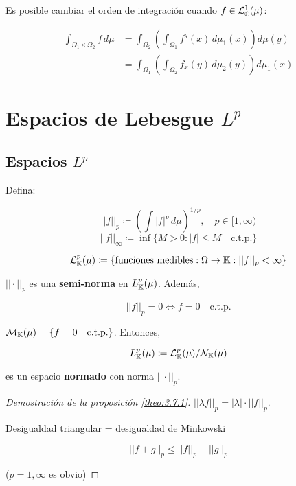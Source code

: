 \begin{ftheorem}[Fubini]
    Es posible cambiar el orden de integración cuando $f\in \mathcal{L}_{\mathbb{C}}^1(\mu)$:

    \begin{align*}
        \int_{\Omega_1\times\Omega_2}f\,d\mu&=\int_{\Omega_2}\left(\int_{\Omega_1} f^y(x)\,d\mu_1(x)\right)d\mu(y)\\
        &=\int_{\Omega_1}\left(\int_{\Omega_2} f_x(y)\,d\mu_2(y)\right)d\mu_1(x)
    \end{align*}

\end{ftheorem}

\section{Espacios de Lebesgue $L^p$}

\subsection{Espacios $L^p$}

Defina: 

\[||f||_p\coloneqq \left(\int |f|^p\,d\mu\right)^{1/p},\quad p\in[1,\infty)\]
\[||f||_\infty\coloneqq \inf\{M>0: |f|\leq M\quad \text{c.t.p.}\}\]

\[\mathcal{L}_{\mathbb{K}}^p(\mu)\coloneqq \{\text{funciones medibles}:\Omega\to\mathbb{K}:||f||_p<\infty\}\]

\begin{fproposition}\label{theo:3.7.1}
    $||\cdot||_p$ es una \textbf{semi-norma} en $L_{\mathbb{K}}^p(\mu)$. Además, 

    \[||f||_p=0\iff f=0\quad\text{c.t.p.}\]
\end{fproposition}

\begin{fcorollary}
    $\mathcal{M}_{\mathbb{K}}(\mu)=\{f=0\quad \text{c.t.p.}\}$. Entonces, 

    \[L_{\mathbb{K}}^p(\mu)\coloneqq \mathcal{L}_{\mathbb{K}}^p(\mu)/\mathcal{N}_{\mathbb{K}}(\mu)\]

    es un espacio \textbf{normado} con norma $||\cdot||_p$.
\end{fcorollary}

\begin{proof}[Demostración de la proposición \ref{theo:3.7.1}]
    $||\lambda f||_p=|\lambda|\cdot ||f||_p$.

    Desigualdad triangular = desigualdad de Minkowski

    \[||f+g||_p\leq ||f||_p+||g||_p\]

    ($p=1,\infty$ es obvio)
\end{proof}

